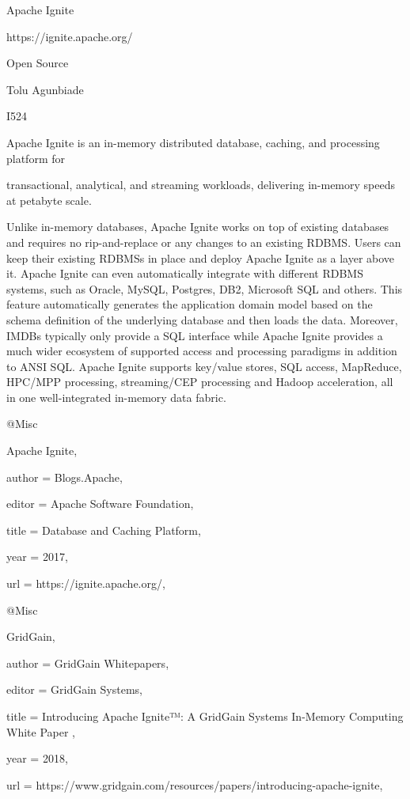 Apache Ignite

https://ignite.apache.org/

Open Source

Tolu Agunbiade

I524

Apache Ignite is an in-memory distributed database, caching, and processing platform for

transactional, analytical, and streaming workloads, delivering in-memory speeds at petabyte scale\cite{hid-sp18-501-Apache Ignite}.

Unlike in-memory databases, Apache Ignite works on top of existing databases and requires no rip-and-replace or any changes to an existing RDBMS. Users can keep their existing RDBMSs in place and deploy Apache Ignite as a layer above it. Apache Ignite can even automatically integrate with different RDBMS systems, such as Oracle, MySQL, Postgres, DB2, Microsoft SQL and others. This feature automatically generates the application domain model based on the schema definition of the underlying database and then loads the data. Moreover, IMDBs typically only provide a SQL interface while Apache Ignite provides a much wider ecosystem of supported access and processing paradigms in addition to ANSI SQL. Apache Ignite supports key/value stores, SQL access, MapReduce, HPC/MPP processing, streaming/CEP processing and Hadoop acceleration, all in one well-integrated in-memory data fabric\cite{hid-sp18-501-GridGain}.

@Misc{Apache Ignite,

  author = {Blogs.Apache},

  editor = {Apache Software Foundation},

  title  = {Database and Caching Platform},

  year   = {2017},

  url    = {https://ignite.apache.org/},

}

@Misc{GridGain,

  author = {GridGain Whitepapers},

  editor = {GridGain Systems},

  title  = {Introducing Apache Ignite™: A GridGain Systems In-Memory Computing White Paper },

  year   = {2018},

  url    = {https://www.gridgain.com/resources/papers/introducing-apache-ignite},

}
